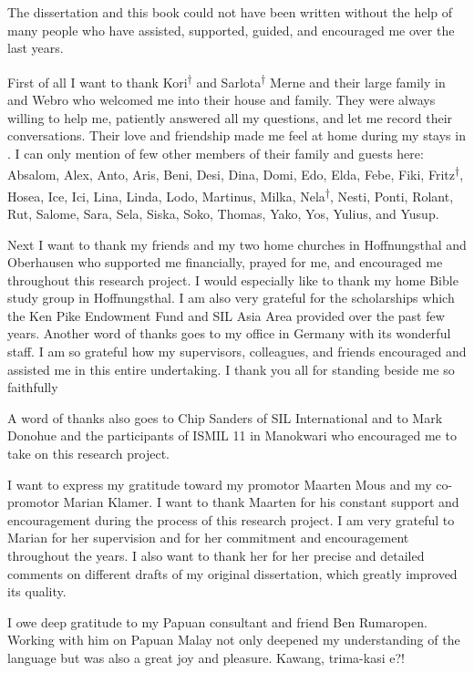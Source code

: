 \begin{refsection}


The dissertation and this book could not have been written without the help of many people who have assisted, supported, guided, and encouraged me over the last years.

First of all I want to thank Kori\textsuperscript{†} and Sarlota\textsuperscript{†} Merne and their large family in  and Webro who welcomed me into their house and family. They were always willing to help me, patiently answered all my questions, and let me record their conversations. Their love and friendship made me feel at home during my stays in . I can only mention of few other members of their family and guests here: Absalom, Alex, Anto, Aris, Beni, Desi, Dina, Domi, Edo, Elda, Febe, Fiki, Fritz\textsuperscript{†}, Hosea, Ice, Ici, Lina, Linda, Lodo, Martinus, Milka, Nela\textsuperscript{†}, Nesti, Ponti, Rolant, Rut, Salome, Sara, Sela, Siska, Soko, Thomas, Yako, Yos, Yulius, and Yusup.

Next I want to thank my friends and my two home churches in Hoffnungsthal and Oberhausen who supported me financially, prayed for me, and encouraged me throughout this research project. I would especially like to thank my home Bible study group in Hoffnungsthal. I am also very grateful for the scholarships which the Ken Pike Endowment Fund and SIL Asia Area provided over the past few years. Another word of thanks goes to my office in Germany with its wonderful staff. I am so grateful how my supervisors, colleagues, and friends encouraged and assisted me in this entire undertaking. I thank you all for standing beside me so faithfully

A word of thanks also goes to Chip Sanders of SIL International and to Mark Donohue and the participants of ISMIL 11 in Manokwari who encouraged me to take on this research project.

I want to express my gratitude toward my promotor Maarten Mous and my co-pro\-mo\-tor Marian Klamer. I want to thank Maarten for his constant support and encouragement during the process of this research project. I am very grateful to Marian for her supervision and for her commitment and encouragement throughout the years. I also want to thank her for her precise and detailed comments on different drafts of my original dissertation, which greatly improved its quality.

I owe deep gratitude to my Papuan consultant and friend Ben Rumaropen. Working with him on Papuan Malay not only deepened my understanding of the language but was also a great joy and pleasure. Kawang, trima-kasi e?!


\end{refsection}
